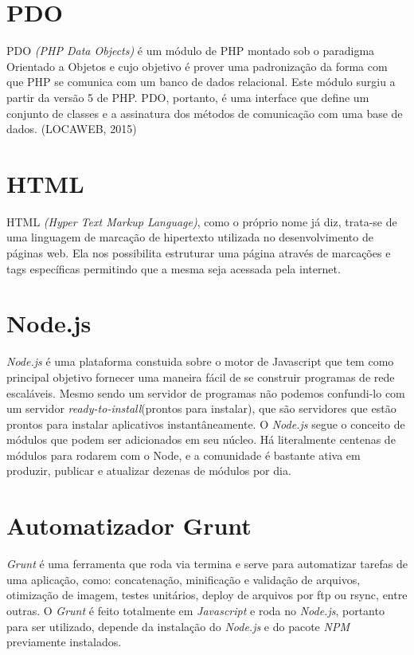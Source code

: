     \section{PDO\label{sec:pdo}}
        PDO \emph{(PHP Data Objects)} é um módulo de PHP montado sob o paradigma Orientado a Objetos e cujo objetivo é prover uma padronização da forma com que PHP se comunica com um banco de dados relacional. Este módulo surgiu a partir da versão 5 de PHP. PDO, portanto, é uma interface que define um conjunto de classes e a assinatura dos métodos de comunicação com uma base de dados. (LOCAWEB, 2015)

    \section{HTML\label{sec:hmtl}}
        HTML \emph{(Hyper Text Markup Language)}, como o próprio nome já diz, trata-se de uma linguagem de marcação de hipertexto utilizada no desenvolvimento de páginas web. Ela nos possibilita estruturar uma página através de marcações e tags específicas permitindo que a mesma seja acessada pela internet.

    \section{Node.js\label{sec:node-js}}
        \emph{Node.js} é uma plataforma constuida sobre o motor de Javascript que tem como principal objetivo fornecer uma maneira fácil de se construir programas de rede escaláveis. Mesmo sendo um servidor de programas não podemos confundi-lo com um servidor \emph{ready-to-install}(prontos para instalar), que são servidores que estão prontos para instalar aplicativos instantâneamente. O \emph{Node.js} segue o conceito de módulos que podem ser adicionados em seu núcleo. Há literalmente centenas de módulos para rodarem com o Node, e a comunidade é bastante ativa em produzir, publicar e atualizar dezenas de módulos por dia.

    \section{Automatizador Grunt\label{sec:automatizador-grunt}}
        \emph{Grunt} é uma ferramenta que roda via termina e serve para automatizar tarefas de uma aplicação,  como: concatenação, minificação e validação de arquivos, otimização de imagem, testes unitários, deploy de arquivos por ftp ou rsync, entre outras. O \emph{Grunt} é feito totalmente em \emph{Javascript} e roda no \emph{Node.js}, portanto para ser utilizado, depende da instalação do \emph{Node.js} e do pacote \emph{NPM} previamente instalados.

